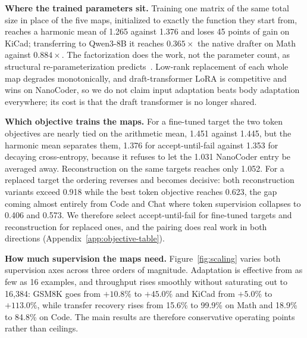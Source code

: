 \textbf{Where the trained parameters sit.} Training one matrix of the same total size in place of the five maps, initialized to exactly the function they start from, reaches a harmonic mean of 1.265 against 1.376 and loses 45 points of gain on KiCad; transferring to Qwen3-8B it reaches $0.365\times$ the native drafter on Math against $0.884\times$. The factorization does the work, not the parameter count, as structural re-parameterization predicts~\citep{huo2026repspec}. Low-rank replacement of each whole map degrades monotonically, and draft-transformer LoRA is competitive and wins on NanoCoder, so we do not claim input adaptation beats body adaptation everywhere; its cost is that the draft transformer is no longer shared.

\textbf{Which objective trains the maps.} For a fine-tuned target the two token objectives are nearly tied on the arithmetic mean, 1.451 against 1.445, but the harmonic mean separates them, 1.376 for accept-until-fail against 1.353 for decaying cross-entropy, because it refuses to let the 1.031 NanoCoder entry be averaged away. Reconstruction on the same targets reaches only 1.052. For a replaced target the ordering reverses and becomes decisive: both reconstruction variants exceed 0.918 while the best token objective reaches 0.623, the gap coming almost entirely from Code and Chat where token supervision collapses to 0.406 and 0.573. We therefore select accept-until-fail for fine-tuned targets and reconstruction for replaced ones, and the pairing does real work in both directions (Appendix~\ref{app:objective-table}).


\textbf{How much supervision the maps need.} Figure~\ref{fig:scaling} varies both supervision axes across three orders of magnitude. Adaptation is effective from as few as 16 examples, and throughput rises smoothly without saturating out to 16{,}384: GSM8K goes from $+10.8\%$ to $+45.0\%$ and KiCad from $+5.0\%$ to $+113.0\%$, while transfer recovery rises from 15.6\% to 99.9\% on Math and 18.9\% to 84.8\% on Code. The main results are therefore conservative operating points rather than ceilings.



